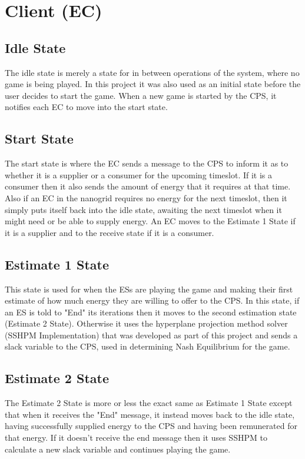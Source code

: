 \documentclass[a4paper, notitlepage]{report}
\begin{document}
\section{Client (EC)}
\label{sec:org5193957}
\subsection{Idle State}
\label{sec:orge758ee9}
The idle state is merely a state for in between operations of the system, where
no game is being played. In this project it was also used as an initial state
before the user decides to start the game. When a new game is started by the
CPS, it notifies each EC to move into the start state.
\subsection{Start State}
\label{sec:org7567eb0}
The start state is where the EC sends a message to the CPS to inform it as to
whether it is a supplier or a consumer for the upcoming timeslot. If it is a
consumer then it also sends the amount of energy that it requires at that time.
Also if an EC in the nanogrid requires no energy for the next timeslot, then it
simply puts itself back into the idle state, awaiting the next timeslot when it
might need or be able to supply energy. An EC moves to the Estimate 1 State if
it is a supplier and to the receive state if it is a consumer.
\subsection{Estimate 1 State}
\label{sec:org3213876}
This state is used for when the ESs are playing the game and making their first
estimate of how much energy they are willing to offer to the CPS. In this state,
if an ES is told to "End" its iterations then it moves to the second estimation
state (Estimate 2 State). Otherwise it uses the hyperplane projection method
solver (SSHPM Implementation) that was developed as part of this project and
sends a slack variable to the CPS, used in determining Nash Equilibrium for the
game. 
\subsection{Estimate 2 State}
\label{sec:org29ed72f}
The Estimate 2 State is more or less the exact same as Estimate 1 State except
that when it receives the "End" message, it instead moves back to the idle
state, having successfully supplied energy to the CPS and having been
remunerated for that energy. If it doesn't receive the end message then it uses
SSHPM to calculate a new slack variable and continues playing the game.
\end{document}
